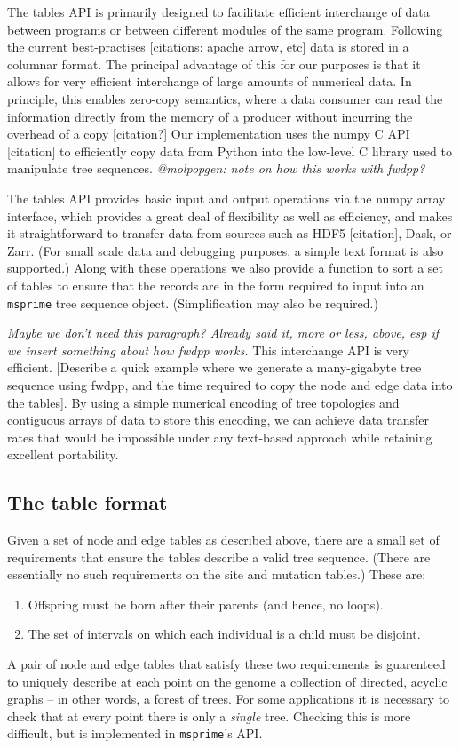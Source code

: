 \documentclass{article}
\newcommand{\msprime}{\texttt{msprime}}
\newcommand{\plr}[1]{{\em \color{blue} #1}}
\begin{document}
The tables API is primarily designed to facilitate efficient interchange of
data between programs or between different modules of the same program.
Following the current best-practises [citations: apache arrow, etc] data is stored
in a columnar format.
The principal advantage of this for our purposes is that it allows for very efficient
interchange of large amounts of numerical data. In principle, this enables
zero-copy semantics, where a data consumer can read the information directly
from the memory of a producer without incurring the overhead of a copy
[citation?] Our implementation uses the numpy C API [citation] to efficiently copy
data from Python into the low-level C library used to manipulate
tree sequences.
\plr{@molpopgen: note on how this works with fwdpp?}

The tables API provides basic input and output operations via the numpy
array interface, which provides a great deal of flexibility as well
as efficiency, and makes it straightforward to transfer data from sources
such as HDF5 [citation], Dask, or Zarr. 
(For small scale data and debugging purposes, a simple text format is also supported.)
Along with these operations we also provide a function to sort a set of tables
to ensure that the records are in the form required to input
into an \msprime{} tree sequence object. (Simplification may also be required.)

\plr{Maybe we don't need this paragraph? Already said it, more or less, above, esp if we insert something about how fwdpp works.}
This interchange API is very efficient. [Describe a quick example where we generate
a many-gigabyte tree sequence using fwdpp, and the time required
to copy the node and edge data into the tables]. By using a simple numerical
encoding of tree topologies and contiguous arrays of data to store this
encoding, we can achieve data transfer rates that would be impossible under
any text-based approach while retaining excellent portability.


\subsection*{The table format}

Given a set of node and edge tables as described above,
there are a small set of requirements that ensure the tables
describe a valid tree sequence.
(There are essentially no such requirements on the site and mutation tables.)
These are:
\begin{enumerate}
    \item Offspring must be born after their parents (and hence, no loops).
    \item The set of intervals on which each individual is a child must be disjoint.
\end{enumerate}
A pair of node and edge tables that satisfy these two requirements
is guarenteed to uniquely describe at each point on the genome
a collection of directed, acyclic graphs -- in other words, a forest of trees.
For some applications it is necessary to check that at every point
there is only a \emph{single} tree.  
Checking this is more difficult, but is implemented in \msprime{}'s API.
\end{document}

